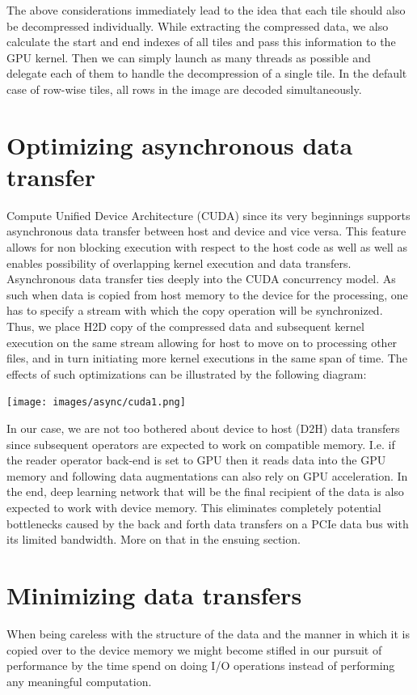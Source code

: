 \documentclass[licencjacka,en]{pracamgr}
\begin{document}
The above considerations immediately lead to the idea that each tile should also be decompressed individually. While extracting the compressed data, we also calculate the start and end indexes of all tiles and pass this information to the GPU kernel. Then we can simply launch as many threads as possible and delegate each of them to handle the decompression of a single tile. In the default case of row-wise tiles, all rows in the image are decoded simultaneously.

\section{Optimizing asynchronous data transfer}
Compute Unified Device Architecture (CUDA) since its very beginnings supports asynchronous data transfer between host and device and vice versa. This feature allows for non blocking execution with respect to the host code as well as well as enables possibility of overlapping kernel execution and data transfers. 
Asynchronous data transfer ties deeply into the CUDA concurrency model. As such when data is copied from host memory to the device for the processing, one has to specify a stream with which the copy operation will be synchronized. Thus, we place H2D copy of the compressed data and subsequent kernel execution on the same stream allowing for host to move on to
processing other files, and in turn initiating more kernel executions in the same span of time. The effects of such optimizations
can be illustrated by the following diagram: 

\centerline{\texttt{[image: images/async/cuda1.png]}}

In our case, we are not too bothered about device to host (D2H) data transfers since subsequent operators are expected to
work on compatible memory. I.e. if the reader operator back-end is set to GPU then it reads data into the GPU memory and
following data augmentations can also rely on GPU acceleration. In the end, deep learning network that will be the final recipient of the data is also expected to work with device memory. This eliminates completely potential bottlenecks caused by the back and forth 
data transfers on a PCIe data bus with its limited bandwidth. More on that in the ensuing section.   



\section{Minimizing data transfers}
When being careless with the structure of the data and the manner in which it is copied over to the device memory we might become stifled in our pursuit of performance by the time spend on doing I/O operations instead of performing any meaningful computation. 
\end{document}
